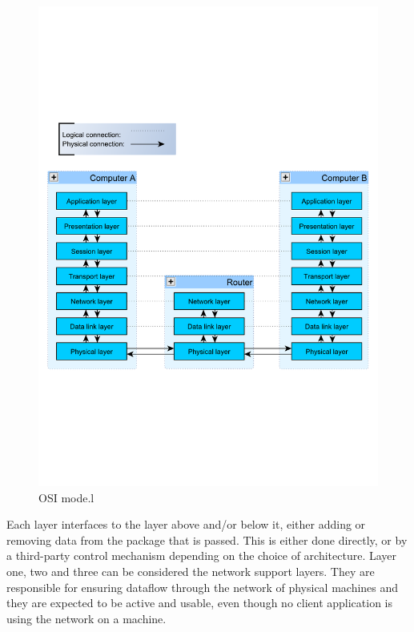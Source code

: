 \begin{figure}[htb]
	\begin{center}
	\includegraphics[scale=0.5,trim=0 200 0 200]{content/graphics/OsiStack.pdf} %
	\caption{OSI mode.l}
	\label{fig:osi_model_stack}			%
	\end{center}
\end{figure}


Each layer interfaces to the layer above and/or below it, either adding or removing data from the package that is passed. This is either done directly, or by a third-party control mechanism depending on the choice of architecture.
Layer one, two and three can be considered the network support layers. They are responsible for ensuring dataflow through the network of physical machines and they are expected to be active and usable, even though no client application is using the network on a machine.

